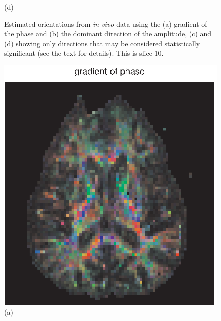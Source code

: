 \documentclass[authoryear,preprint,12pt]{elsarticle}
\begin{document}
\begin{figure}[p]
\begin{center}
\begin{minipage}[]{.42\textwidth}
      (d)
    \end{minipage}
  \end{center}
  \caption{Estimated orientations from {\em in vivo} data using the
    (a) gradient of the phase and (b) the dominant direction of the
    amplitude, (c) and (d) showing only directions that may be
    considered statistically significant (see the text for
    details). This is slice 10.}
  \label{fig1} 
\end{figure}

\begin{figure}[p]
  \begin{center}
   \begin{minipage}[]{.42\textwidth}
      \centering
      \includegraphics[width=\textwidth]{gradphase55a.eps}
      (a)
      \end{minipage}
       \begin{minipage}[]{.42\textwidth}
      \centering

\end{minipage}
\end{center}
\end{figure}
\end{document}
